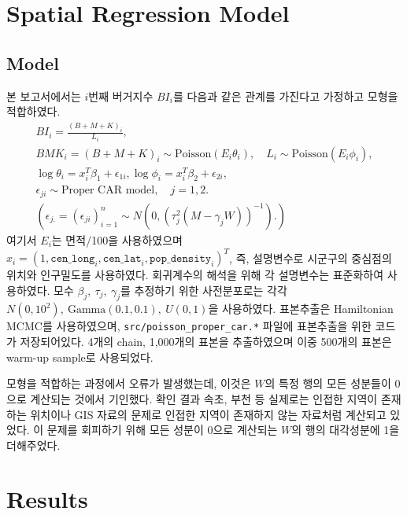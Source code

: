 \documentclass{scrartcl}
\begin{document}
\section{Spatial Regression Model}\label{sec:sreg}

\subsection{Model}\label{subsec:sreg:model}

본 보고서에서는 $i$번째 버거지수 $BI_i$를 다음과 같은 관계를 가진다고 가정하고 모형을 적합하였다.
\begin{equation}\label{eqn:sreg}
    \begin{gathered}
    BI_i = \frac{(B+M+K)_i}{L_i},\\
    BMK_i = (B+M+K)_i \sim \textrm{Poisson}(E_i \theta_i), \quad L_i \sim \textrm{Poisson}(E_i \phi_i), \\
    \log \theta_i = x_i^T \beta_1 + \epsilon_{1i}, \log \phi_i = x_i^T \beta_2 + \epsilon_{2i}, \\
    \epsilon_{ji} \sim \textrm{Proper CAR model}, \quad j=1,2. \\
    (\epsilon_{j.} = (\epsilon_{ji})_{i=1}^n \sim N(0,(\tau_j^2 (M-\gamma_j W))^{-1} ).)
    \end{gathered}
\end{equation}
여기서 $E_i$는 면적/100을 사용하였으며 $x_i = (1, \texttt{cen\_long}_i, \texttt{cen\_lat}_i, \texttt{pop\_density}_i)^T$, 즉, 설명변수로 시군구의 중심점의 위치와 인구밀도를 사용하였다. 회귀계수의 해석을 위해 각 설명변수는 표준화하여 사용하였다. 모수 $\beta_j,~\tau_j,~\gamma_j$를 추정하기 위한 사전분포로는 각각 $N(0, 10^2),~\textrm{Gamma}(0.1, 0.1),~U(0,1)$을 사용하였다. 표본추출은 Hamiltonian MCMC를 사용하였으며, \texttt{src/poisson\_proper\_car.*} 파일에 표본추출을 위한 코드가 저장되어있다. 4개의 chain, 1,000개의 표본을 추출하였으며 이중 500개의 표본은 warm-up sample로 사용되었다. 

모형을 적합하는 과정에서 오류가 발생했는데, 이것은 $W$의 특정 행의 모든 성분들이 0으로 계산되는 것에서 기인했다. 확인 결과 속초, 부천 등 실제로는 인접한 지역이 존재하는 위치이나 GIS 자료의 문제로 인접한 지역이 존재하지 않는 자료처럼 계산되고 있었다. 이 문제를 회피하기 위해 모든 성분이 0으로 계산되는 $W$의 행의 대각성분에 1을 더해주었다.

\section{Results}\label{sec:result}
\end{document}
